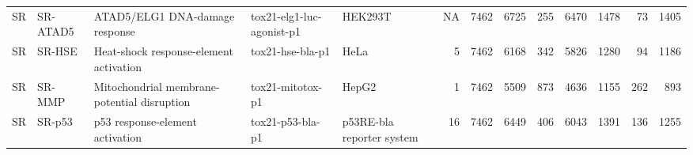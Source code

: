\begin{longtable}{lllllrrrrrrrr}
SR & SR-ATAD5 & ATAD5/ELG1 DNA-damage response & tox21-elg1-luc-agonist-p1 & HEK293T & NA & 7462 & 6725 & 255 & 6470 & 1478 & 73 & 1405 \\
SR & SR-HSE & Heat-shock response-element activation & tox21-hse-bla-p1 & HeLa & 5 & 7462 & 6168 & 342 & 5826 & 1280 & 94 & 1186 \\
SR & SR-MMP & Mitochondrial membrane-potential disruption & tox21-mitotox-p1 & HepG2 & 1 & 7462 & 5509 & 873 & 4636 & 1155 & 262 & 893 \\
SR & SR-p53 & p53 response-element activation & tox21-p53-bla-p1 & p53RE-bla reporter system & 16 & 7462 & 6449 & 406 & 6043 & 1391 & 136 & 1255 \\
\end{longtable}
